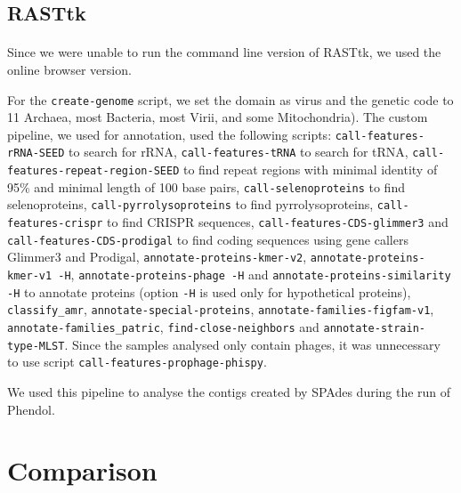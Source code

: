 \subsection{RASTtk}
\paragraph*{}
Since we were unable to run the command line version of RASTtk, we used the online browser version.

For the \texttt{create-genome} script, we set the domain as virus and the genetic code to 11 Archaea, most Bacteria, most Virii, and some Mitochondria). The custom pipeline, we used for annotation, used the following scripts: \texttt{call-features-rRNA-SEED} to search for rRNA, \texttt{call-features-tRNA} to search for tRNA, \texttt{call-features-repeat-region-SEED} to find repeat regions with minimal identity of 95\% and minimal length of 100 base pairs, \texttt{call-selenoproteins} to find selenoproteins, \texttt{call-pyrrolysoproteins} to find pyrrolysoproteins, \texttt{call-features-crispr} to find CRISPR sequences, \texttt{call-features-CDS-glimmer3} and \texttt{call-features-CDS-prodigal} to find coding sequences using gene callers Glimmer3 and Prodigal, \texttt{annotate-proteins-kmer-v2}, \texttt{annotate-proteins-kmer-v1 -H}, \texttt{annotate-proteins-phage -H} and \texttt{annotate-proteins-similarity -H} to annotate proteins (option \texttt{-H} is used only for hypothetical proteins), \texttt{classify\_amr}, \texttt{annotate-special-proteins}, \texttt{annotate-families-figfam-v1}, \texttt{annotate-families\_patric}, \texttt{find-close-neighbors} and \texttt{annotate-strain-type-MLST}. Since the samples analysed only contain phages, it was unnecessary to use script \texttt{call-features-prophage-phispy}.

We used this pipeline to analyse the contigs created by SPAdes during the run of Phendol.

\section{Comparison}